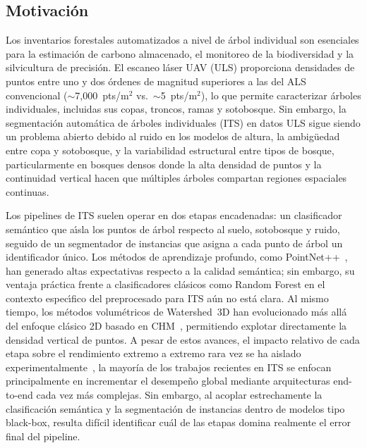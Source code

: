 \documentclass{cys}
\begin{document}
\subsection{Motivaci\'on}

Los inventarios forestales automatizados a nivel de \'arbol individual son esenciales para la estimaci\'on de carbono almacenado, el monitoreo de la biodiversidad y la silvicultura de precisi\'on. El escaneo l\'aser UAV (ULS) proporciona densidades de puntos entre uno y dos \'ordenes de magnitud superiores a las del ALS convencional ($\sim$7{,}000~pts/m$^2$ vs.\ $\sim$5~pts/m$^2$), lo que permite caracterizar \'arboles individuales, incluidas sus copas, troncos, ramas y sotobosque. Sin embargo, la segmentaci\'on autom\'atica de \'arboles individuales (ITS) en datos ULS sigue siendo un problema abierto debido al ruido en los modelos de altura, la ambig\"uedad entre copa y sotobosque, y la variabilidad estructural entre tipos de bosque, particularmente en bosques densos donde la alta densidad de puntos y la continuidad vertical hacen que múltiples árboles compartan regiones espaciales continuas.



Los pipelines de ITS suelen operar en dos etapas encadenadas: un clasificador sem\'antico que a\'\i{}sla los puntos de \'arbol respecto al suelo, sotobosque y ruido, seguido de un segmentador de instancias que asigna a cada punto de \'arbol un identificador \'unico. Los m\'etodos de aprendizaje profundo, como PointNet++~\cite{qi2017}, han generado altas expectativas respecto a la calidad sem\'antica; sin embargo, su ventaja pr\'actica frente a clasificadores cl\'asicos como Random Forest en el contexto espec\'\i{}fico del preprocesado para ITS a\'un no est\'a clara. Al mismo tiempo, los m\'etodos volum\'etricos de Watershed~3D han evolucionado m\'as all\'a del enfoque cl\'asico 2D basado en CHM~\cite{dalponte2016}, permitiendo explotar directamente la densidad vertical de puntos. A pesar de estos avances, el impacto relativo de cada etapa sobre el rendimiento extremo a extremo rara vez se ha aislado experimentalmente~\cite{qi2017,breiman2001,puliti2023}, la mayoría de los trabajos recientes en ITS se enfocan principalmente en incrementar el desempeño global mediante arquitecturas end-to-end cada vez más complejas. Sin embargo, al acoplar estrechamente la clasificación semántica y la segmentación de instancias dentro de modelos tipo black-box, resulta difícil identificar cuál de las etapas domina realmente el error final del pipeline.
\end{document}
